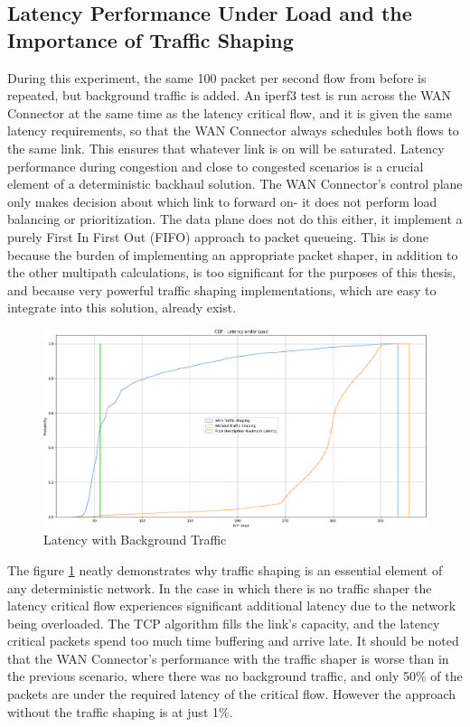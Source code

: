 \subsection{Latency Performance Under Load and the Importance of Traffic Shaping}

During this experiment, the same 100 packet per second flow from before is repeated, but background traffic is added. An iperf3 test is run across the WAN Connector at the same time as the latency critical flow, and it is given the same latency requirements, so that the WAN Connector always schedules both flows to the same link. This ensures that whatever link is on will be saturated. Latency performance during congestion and close to congested scenarios is a crucial element of a deterministic backhaul solution. The WAN Connector's control plane only makes decision about which link to forward on- it does not perform load balancing or prioritization. The data plane does not do this either, it implement a purely First In First Out (FIFO) approach to packet queueing. This is done because the burden of implementing an appropriate packet shaper, in addition to the other multipath calculations, is too significant for the purposes of this thesis, and because very powerful traffic shaping implementations, which are easy to integrate into this solution, already exist.

\begin{figure}[h]
    \centering
        \includegraphics[height=0.66\textwidth,width=\textwidth]{fig/rrul_cdf.png}
        \caption{Latency with Background Traffic}
        \label{fig:rrul_cdf}
\end{figure}

The figure \ref{fig:rrul_cdf} neatly demonstrates why traffic shaping is an essential element of any deterministic network. In the case in which there is no traffic shaper the latency critical flow experiences significant additional latency due to the network being overloaded. The TCP algorithm fills the link's capacity, and the latency critical packets spend too much time buffering and arrive late. It should be noted that the WAN Connector's performance with the traffic shaper is worse than in the previous scenario, where there was no background traffic, and only 50\% of the packets are under the required latency of the critical flow. However the approach without the traffic shaping is at just 1\%.

